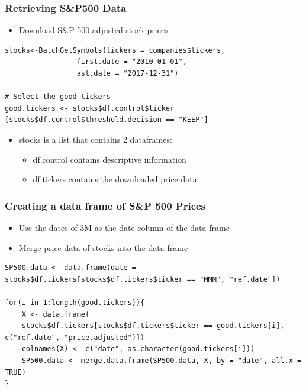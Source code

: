 \documentclass{beamer}
\begin{document}
\begin{frame}[fragile]
\frametitle{Retrieving S&P500 Data}
\begin{itemize}
\item Download S\&P 500 adjusted stock prices
\end{itemize}
\begin{lstlisting}
stocks<-BatchGetSymbols(tickers = companies$tickers, 
                 first.date = "2010-01-01",
                 ast.date = "2017-12-31")

# Select the good tickers
good.tickers <- stocks$df.control$ticker [stocks$df.control$threshold.decision == "KEEP"]
\end{lstlisting}
\begin{itemize}
\item stocks is a list that contains 2 dataframes:
\begin{itemize}
\item df.control contains descriptive information %
\item df.tickers contains the downloaded price data %
\end{itemize}
\end{itemize}
\end{frame}

\begin{frame}[fragile]
\frametitle{Creating a data frame of S\&P 500 Prices}
\begin{itemize}
\item Use the dates of 3M as the date column of the data frame
\item Merge price data of stocks into the data frame %
\end{itemize}
\begin{lstlisting}
SP500.data <- data.frame(date = stocks$df.tickers[stocks$df.tickers$ticker == "MMM", "ref.date"])

for(i in 1:length(good.tickers)){ 
    X <- data.frame(
    stocks$df.tickers[stocks$df.tickers$ticker == good.tickers[i], c("ref.date", "price.adjusted")])
    colnames(X) <- c("date", as.character(good.tickers[i]))
    SP500.data <- merge.data.frame(SP500.data, X, by = "date", all.x = TRUE)
}
\end{lstlisting}

\end{frame}
\end{document}
